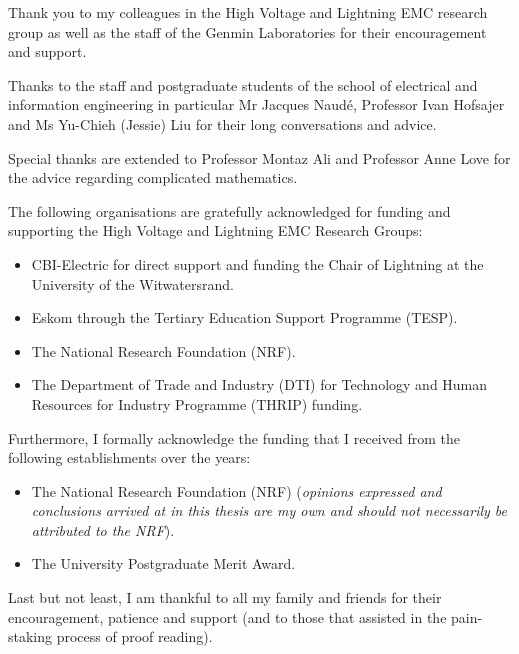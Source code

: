 \documentclass[11pt, a4paper, oneside]{Thesis} %
\begin{document}
{{Thank you to my colleagues in the High Voltage and Lightning EMC research group as well as the staff of the Genmin Laboratories for their encouragement and support.

Thanks to the staff and postgraduate students of the school of electrical and information engineering in particular Mr Jacques Naud\'e, Professor Ivan Hofsajer and Ms Yu-Chieh (Jessie) Liu for their long conversations and advice.

Special thanks are extended to Professor Montaz Ali and Professor Anne Love for the advice regarding complicated mathematics.

The following organisations are gratefully acknowledged for funding and supporting the High Voltage and Lightning EMC Research Groups:
\begin{itemize}
    \item CBI-Electric for direct support and funding the Chair of Lightning at the University of the Witwatersrand.
    \item Eskom through the Tertiary Education Support Programme (TESP).
    \item The National Research Foundation (NRF).
    \item The Department of Trade and Industry (DTI) for Technology and Human Resources for Industry Programme (THRIP) funding.
\end{itemize}

Furthermore, I formally acknowledge the funding that I received from the following establishments over the years:
\begin{itemize}
    \item The National Research Foundation (NRF) (\textit{opinions expressed and conclusions arrived at in this thesis are my own and should not necessarily be attributed to the NRF}).
    \item The University Postgraduate Merit Award.
\end{itemize}

Last but not least, I am thankful to all my family and friends for their encouragement, patience and support (and to those that assisted in the pain-staking process of proof reading).
}
\clearpage %


\pagestyle{fancy} %

}
\end{document}
